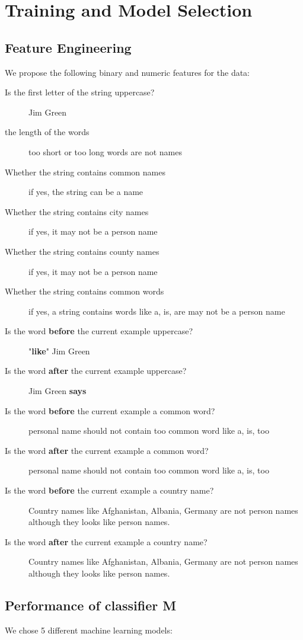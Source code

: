 \documentclass{article}
\begin{document}
\section{Training and Model Selection}

\subsection{ Feature Engineering}

We propose the following binary and numeric features for the  data:

\begin{description}
\item[Is the first letter of the string  uppercase?] Jim Green
\item[the length of the words] too short or too long words are not names
\item[Whether the string contains common names] if yes, the string can be a name
\item[Whether the string contains city names] if yes, it may not be a person name 
\item[Whether the string contains county names] if yes, it may not be a person name 
\item[Whether the string contains common words] if yes, a string contains words like a, is, are may not be a person name
\item[Is the word \textbf{before} the current example uppercase?]  "\textbf{like}" Jim Green 
\item[Is the word \textbf{after} the current example uppercase?] Jim Green \textbf{says}
\item[Is the word \textbf{before} the current example a common word?] personal name should not contain too common word like a, is, too
\item[Is the word \textbf{after} the current example a common word?] personal name should not contain too common word like a, is, too
\item[Is the word \textbf{before} the current example a country name?] Country names like Afghanistan, Albania, Germany are not person names although they looks like person names.
\item[Is the word \textbf{after} the current example a country name?] Country names like Afghanistan, Albania, Germany are not person names although they looks like person names.


\end{description}

\subsection{Performance of classifier M}
We chose 5 different machine learning models:
\end{document}

